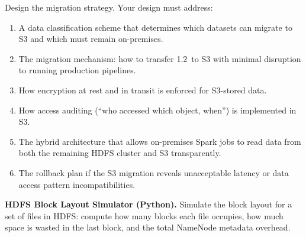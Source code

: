Design the migration strategy. Your design must address:
\begin{enumerate}[label=(\alph*)]
  \item A data classification scheme that determines which datasets
        can migrate to S3 and which must remain on-premises.
  \item The migration mechanism: how to transfer 1.2\PB\ to S3 with
        minimal disruption to running production pipelines.
  \item How encryption at rest and in transit is enforced for S3-stored
        data.
  \item How access auditing (``who accessed which object, when'') is
        implemented in S3.
  \item The hybrid architecture that allows on-premises Spark jobs to
        read data from both the remaining HDFS cluster and S3
        transparently.
  \item The rollback plan if the S3 migration reveals unacceptable
        latency or data access pattern incompatibilities.
\end{enumerate}

\bigskip
{}

\pe \textbf{HDFS Block Layout Simulator (Python).}
Simulate the block layout for a set of files in HDFS: compute how many
blocks each file occupies, how much space is wasted in the last block,
and the total NameNode metadata overhead.

